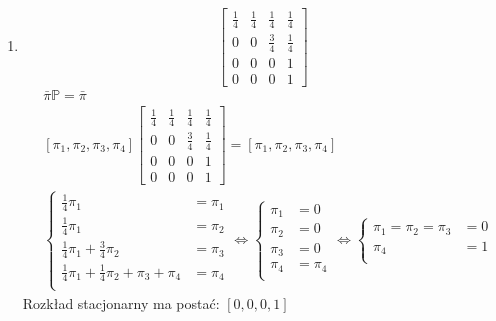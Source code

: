 \begin{enumerate}[label=\alph*)]
\item 
$$\begin{bmatrix}
\frac{1}{4}&\frac{1}{4}&\frac{1}{4}&\frac{1}{4}\\
0&0&\frac{3}{4}&\frac{1}{4}\\
0&0&0&1\\
0&0&0&1
\end{bmatrix}$$
\begin{align*}
&\bar{\pi}\mathbb{P}=\bar{\pi}\\
&\left[\pi _1, \pi _2,\pi _3,\pi _4\right]\begin{bmatrix}
\frac{1}{4}&\frac{1}{4}&\frac{1}{4}&\frac{1}{4}\\
0&0&\frac{3}{4}&\frac{1}{4}\\
0&0&0&1\\
0&0&0&1
\end{bmatrix} = \left[\pi _1, \pi _2,\pi _3,\pi _4\right]\\
&\left\{\begin{matrix}
\frac{1}{4}\pi _1 &= \pi _1\\
\frac{1}{4}\pi _1 &= \pi _2\\
\frac{1}{4}\pi _1 +\frac{3}{4} \pi _2&= \pi _3\\
\frac{1}{4}\pi _1 +\frac{1}{4} \pi _2+\pi _3 + \pi _4&= \pi _4\\
\end{matrix}\right.\Leftrightarrow \left\{\begin{matrix}
\pi _1 &= 0\\
\pi _2 &= 0\\
\pi _3&= 0\\
\pi _4&= \pi _4\\
\end{matrix}\right. \Leftrightarrow \left\{\begin{matrix}
\pi _1 = \pi _2=\pi _3 &= 0\\
\pi _4&= 1\\
\end{matrix}\right.
\end{align*}
Rozkład stacjonarny ma postać: $\left[0, 0, 0, 1\right]$


\end{enumerate}
